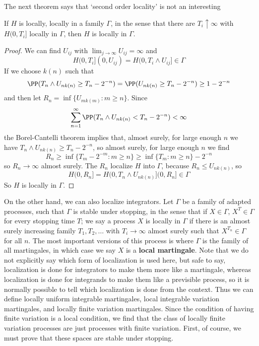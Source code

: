The next theorem says that `second order locality' is not an interesting 

\begin{theorem}
    If $H$ is locally, locally in a family $\Gamma$, in the sense that there are $T_i \uparrow \infty$ with $H(0,T_i]$ locally in $\Gamma$, then $H$ is locally in $\Gamma$.
\end{theorem}
\begin{proof}
    We can find $U_{ij}$ with $\lim_{j \to \infty} U_{ij} = \infty$ and
    \[ H(0,T_i](0,U_{ij}) = H(0,T_i \wedge U_{ij}] \in \Gamma \]
    If we choose $k(n)$ such that 
    \[ \PP(T_n \wedge U_{nk(n)} \geq T_n - 2^{-n}) = \PP(U_{nk(n)} \geq T_n - 2^{-n}) \geq 1 - 2^{-n} \]
    and then let $R_n = \inf \{ U_{mk(m)}: m \geq n \}$. Since
    \[ \sum_{n = 1}^\infty \PP(T_n \wedge U_{nk(n)} < T_n - 2^{-n}) < \infty \]
    the Borel-Cantelli theorem implies that, almost surely, for large enough $n$ we have $T_n \wedge U_{nk(n)} \geq T_n - 2^{-n}$, so almost surely, for large enough $n$ we find
    \[ R_n \geq \inf \{ T_m - 2^{-m}: m \geq n \} \geq \inf \{ T_m : m \geq n \} - 2^{-n} \]
    so $R_n \to \infty$ almost surely. The $R_n$ localize $H$ into $\Gamma$, because $R_n \leq U_{nk(n)}$, so
    \[ H(0,R_n] = H(0,T_n \wedge U_{nk(n)}](0,R_n] \in \Gamma \]
    So $H$ is locally in $\Gamma$.
\end{proof}

On the other hand, we can also localize integrators. Let $\Gamma$ be a family of adapted processes, such that $\Gamma$ is stable under stopping, in the sense that if $X \in \Gamma$, $X^T \in \Gamma$ for every stopping time $T$; we say a process $X$ is locally in $\Gamma$ if there is an almost surely increasing family $T_1, T_2, \dots$ with $T_i \to \infty$ almost surely such that $X^{T_n} \in \Gamma$ for all $n$. The most important versions of this process is where $\Gamma$ is the family of all martingales, in which case we say $X$ is a {\bf local martingale}. Note that we do not explicitly say which form of localization is used here, but safe to say, localization is done for integrators to make them more like a martingale, whereas localization is done for integrands to make them like a previsible process, so it is normally possible to tell which localization is done from the context. Thus we can define locally uniform integrable martingales, local integrable variation martingales, and locally finite variation martingales. Since the condition of having finite variation is a local condition, we find that the class of locally finite variation processes are just processes with finite variation. First, of course, we must prove that these spaces are stable under stopping.


